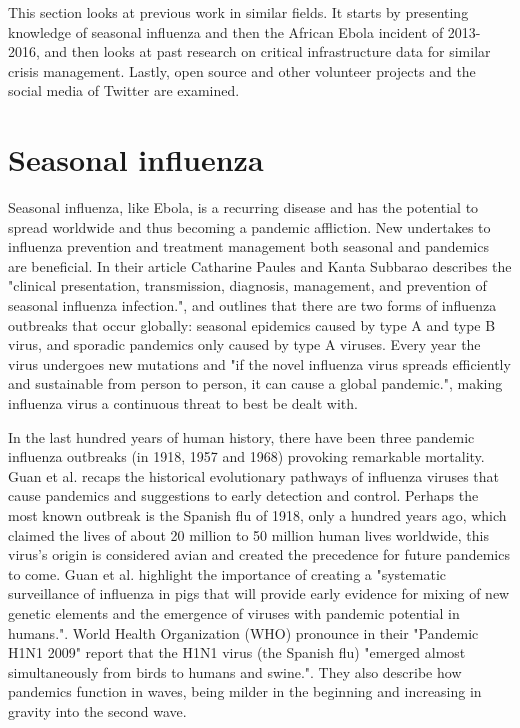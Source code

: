 This section looks at previous work in similar fields. It starts by presenting knowledge of seasonal influenza and then the African Ebola incident of 2013-2016, and then looks at past research on critical infrastructure data for similar crisis management. Lastly, open source and other volunteer projects and the social media of Twitter are examined.


\section{Seasonal influenza}
Seasonal influenza, like Ebola, is a recurring disease and has the potential to spread worldwide and thus becoming a pandemic affliction. New undertakes to influenza prevention and treatment management both seasonal and pandemics are beneficial. In their article Catharine Paules and Kanta Subbarao\cite{article_Paules} describes the "clinical presentation, transmission, diagnosis, management, and prevention of seasonal influenza infection.", and outlines that there are two forms of influenza outbreaks that occur globally: seasonal epidemics caused by type A and type B virus, and sporadic pandemics only caused by type A viruses. Every year the virus undergoes new mutations and "if the novel influenza virus spreads efficiently and sustainable from person to person, it can cause a global pandemic.", making influenza virus a continuous threat to best be dealt with.

In the last hundred years of human history, there have been three pandemic influenza outbreaks (in 1918, 1957 and 1968) provoking remarkable mortality. Guan et al.\cite{guan2010emergence} recaps the historical evolutionary pathways of influenza viruses that cause pandemics and suggestions to early detection and control. Perhaps the most known outbreak is the Spanish flu of 1918, only a hundred years ago, which claimed the lives of about 20 million to 50 million human lives worldwide, this virus's origin is considered avian and created the precedence for future pandemics to come. Guan et al. highlight the importance of creating a "systematic surveillance of influenza in pigs that will provide early evidence for mixing of new genetic elements and the emergence of viruses with pandemic potential in humans.". World Health Organization (WHO) pronounce in their "Pandemic H1N1 2009"\cite{world2009pandemic} report that the H1N1 virus (the Spanish flu) "emerged almost simultaneously from birds to humans and swine.". They also describe how pandemics function in waves, being milder in the beginning and increasing in gravity into the second wave.

